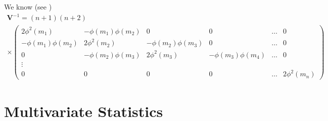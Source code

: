 We know (see \cite{hammersley1954estimation,plackett1958linear})
\begin{equation}
    \begin{array}{l}
\mathbf{V}^{-1}=(n+1)(n+2) \\
\times\left(\begin{array}{cccccc}
2 \phi^{2}\left(m_{1}\right) & -\phi\left(m_{1}\right) \phi\left(m_{2}\right) & 0 & 0 & \ldots & 0 \\
-\phi\left(m_{1}\right) \phi\left(m_{2}\right) & 2 \phi^{2}\left(m_{2}\right) & -\phi\left(m_{2}\right) \phi\left(m_{3}\right) & 0 & \ldots & 0 \\
0 & -\phi\left(m_{2}\right) \phi\left(m_{3}\right) & 2 \phi^{2}\left(m_{3}\right) & -\phi\left(m_{3}\right) \phi\left(m_{4}\right) & \ldots & 0 \\
\vdots & & & & & \\
0 & 0 & 0 & 0 & \ldots & 2 \phi^{2}\left(m_{n}\right)
\end{array}\right)
\end{array}
\end{equation}




\section{Multivariate Statistics}
\label{sec:multivariate_tests}





